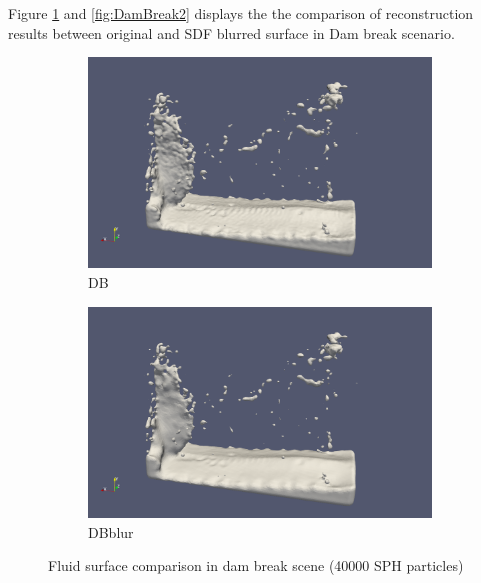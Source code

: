 Figure \ref{fig:DamBreak} and \ref{fig:DamBreak2} displays the  the comparison of reconstruction results between original and SDF blurred surface in Dam break scenario.
\begin{figure}
	\begin{center}
        \begin{subfigure}[b]{\textwidth}
               \includegraphics[width=\textwidth]{figures/ReconstructionDencityBased.png}
				\caption{DB}
        \end{subfigure}
        \begin{subfigure}[b]{\textwidth}
               \includegraphics[width=\textwidth]{figures/ReconstructionDencityBasedBlur.png}
				\caption{DBblur}
        \end{subfigure}
	\end{center}
	\caption{Fluid surface comparison in dam break scene (40000 SPH particles)}
	\label{fig:DamBreak}
\end{figure}
